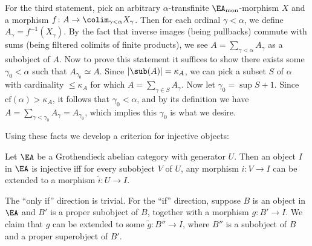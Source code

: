 \documentclass[twoside]{article}
\begin{document}
For the third statement, pick an arbitrary $\alpha$-transfinite $\EA_{\mathrm{mon}}$-morphism $X$ and a morphism $f\colon A \rightarrow \colim_{\gamma < \alpha} X_\gamma$. Then for each ordinal $\gamma < \alpha$, we define $A_\gamma = f^{-1} (X_\gamma)$. By the fact that inverse images (being pullbacks) commute with sums (being filtered colimits of finite products), we see $A = \sum_{\gamma < \alpha} A_\gamma$ as a subobject of $A$. Now to prove this statement it suffices to show there exists some $\gamma_0 < \alpha$ such that $A_{\gamma_0} \simeq A$. Since $\left| \sub(A) \right| = \kappa_A$, we can pick a subset $S$ of $\alpha$ with cardinality $\leq \kappa_A$ for which $A = \sum_{\gamma \in S} A_\gamma$. Now let $\gamma_0 = \sup S + 1$. Since $\mathrm{cf}(\alpha) > \kappa_A$, it follows that $\gamma_0 < \alpha$, and by its definition we have $A = \sum_{\gamma < \gamma_0} A_\gamma = A_{\gamma_0}$, which implies this $\gamma_0$ is what we desire.
\epf

Using these facts we develop a criterion for injective objects:
\begin{lemma} \label{baer}
Let $\EA$ be a Grothendieck abelian category with generator $U$. Then an object $I$ in $\EA$ is injective iff for every subobject $V$ of $U$, any morphism $i\colon V \rightarrow I$ can be extended to a morphism $\widetilde{i}\colon U \rightarrow I$.
\end{lemma}
The ``only if'' direction is trivial. For the ``if'' direction, suppose $B$ is an object in $\EA$ and $B'$ is a proper subobject of $B$, together with a morphism $g\colon B' \rightarrow I$. We claim that $g$ can be extended to some $\widetilde{g}\colon B'' \rightarrow I$, where $B''$ is a subobject of $B$ and a proper superobject of $B'$.\vspace{\topsep}
\end{document}

